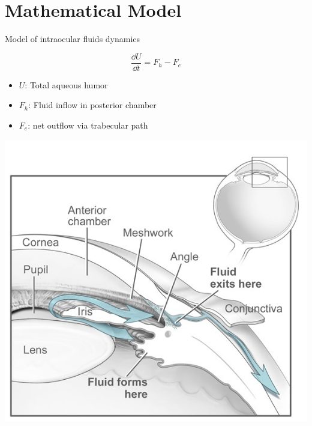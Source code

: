 \section{Mathematical Model}
\frame{\sectionpage}
\begin{frame}{Model of intraocular fluids dynamics}
\begin{block}{}
\[
\frac{\dd U}{\dd t}=F_{h}-F_{e}
\]
\end{block}
\begin{itemize}
\item $U$: Total aqueous humor
\item $F_h$: Fluid inflow in posterior chamber
\item $F_e$: net outflow via trabecular path
\end{itemize}

\begin{center}
\includegraphics[width=.4\linewidth]{Humor.jpg}
\end{center}

\end{frame}

